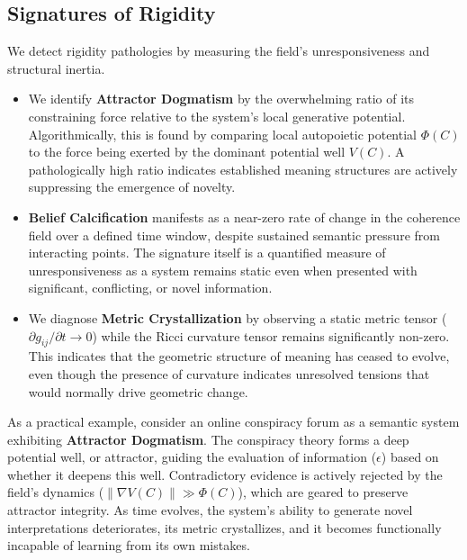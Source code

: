 \subsection{Signatures of Rigidity}
\label{16.2.1:signatures_of_rigidity}

We detect rigidity pathologies by measuring the field's unresponsiveness and structural inertia.

\begin{itemize}

    \item We identify \textbf{Attractor Dogmatism} by the overwhelming ratio of its constraining force relative to the system's local generative potential. Algorithmically, this is found by comparing local autopoietic potential \(\Phi(C)\) to the force being exerted by the dominant potential well \(V(C)\). A pathologically high ratio indicates established meaning structures are actively suppressing the emergence of novelty.

    \item \textbf{Belief Calcification} manifests as a near-zero rate of change in the coherence field over a defined time window, despite sustained semantic pressure from interacting points. The signature itself is a quantified measure of unresponsiveness as a system remains static even when presented with significant, conflicting, or novel information.

    \item We diagnose \textbf{Metric Crystallization} by observing a static metric tensor (\(\partial g_{ij} / \partial t \to 0\)) while the Ricci curvature tensor remains significantly non-zero. This indicates that the geometric structure of meaning has ceased to evolve, even though the presence of curvature indicates unresolved tensions that would normally drive geometric change.

\end{itemize}

As a practical example, consider an online conspiracy forum as a semantic system exhibiting \textbf{Attractor Dogmatism}. The conspiracy theory forms a deep potential well, or attractor, guiding the evaluation of information (\(\epsilon\)) based on whether it deepens this well. Contradictory evidence is actively rejected by the field's dynamics (\(\|\nabla V(C)\| \gg \Phi(C)\)), which are geared to preserve attractor integrity. As time evolves, the system's ability to generate novel interpretations deteriorates, its metric crystallizes, and it becomes functionally incapable of learning from its own mistakes.

